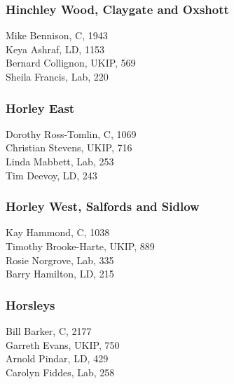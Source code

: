 \documentclass[a4paper,openany,10pt]{book}
\begin{document}
\subsubsection*{Hinchley Wood, Claygate and Oxshott}



Mike Bennison, C, 1943\\
Keya Ashraf, LD, 1153\\
Bernard Collignon, UKIP, 569\\
Sheila Francis, Lab, 220\\


\subsubsection*{Horley East}



Dorothy Ross-Tomlin, C, 1069\\
Christian Stevens, UKIP, 716\\
Linda Mabbett, Lab, 253\\
Tim Deevoy, LD, 243\\


\subsubsection*{Horley West, Salfords and Sidlow}



Kay Hammond, C, 1038\\
{Timothy Brooke-Harte}, UKIP, 889\\
Rosie Norgrove, Lab, 335\\
Barry Hamilton, LD, 215\\


\subsubsection*{Horsleys}



Bill Barker, C, 2177\\
Garreth Evans, UKIP, 750\\
Arnold Pindar, LD, 429\\
Carolyn Fiddes, Lab, 258\\
\end{document}
